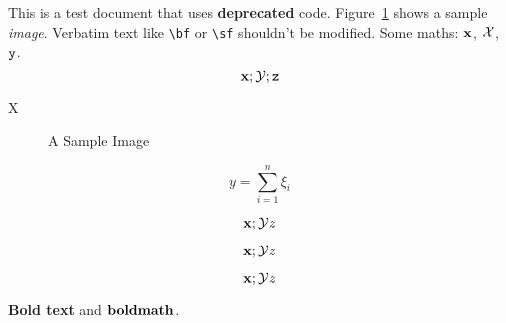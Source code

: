 \documentclass[12pt,a4paper]{article}
\newcommand{\boldstuff}[1]{{\bf #1}}
\begin{document}
This is a test {\sf document} that uses {\bf deprecated} code.
Figure~\ref{fig:sample} shows a sample {\it image}.
  Verbatim text like \verb|\bf| or \verb|\sf| shouldn't be
modified. Some maths: $\bf x$, \begin{math}\cal X\end{math},
\(\tt y\).
\[
  {\bf x}; {\cal Y}; {\tt z}
\]

   \centerline{X}

\begin{figure}
\centerline{}
\caption{A Sample Image}
\label{fig:sample}
\end{figure}

$$y = \sum_{i=1}^n \xi_i$$

$${\bf x}; {\cal Y} {\it z}$$

\begin{displaymath}
{\bf x}; {\cal Y} {\it z}
\end{displaymath}

\begin{equation}
{\bf x}; {\cal Y} {\it z}
\end{equation}

\boldstuff{Bold text} and $\boldstuff{bold math}$.
\end{document}
